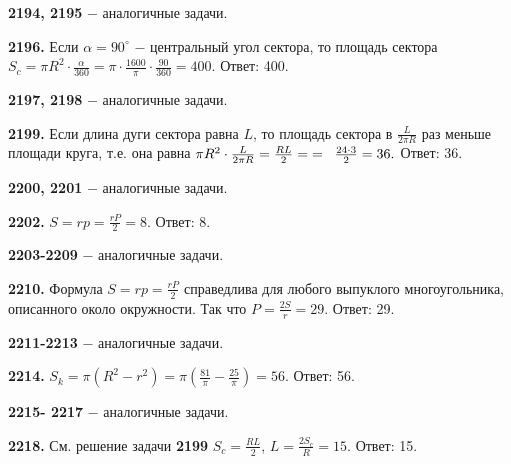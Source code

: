 \textbf{2194, 2195} $-$ аналогичные задачи.

\textbf{2196.} Если $\alpha = 90^\circ$ $-$ центральный угол сектора, то площадь сектора $S_c=\pi R^2 \cdot \frac{\alpha}{360}=\pi \cdot \frac{1600}{\pi}\cdot \frac{90}{360} =400.$ \newline \null \hspace*{\fill} Ответ: 400.

\textbf{2197, 2198} $-$ аналогичные задачи.

\textbf{2199.} Если длина дуги сектора равна $L$, то площадь сектора в $\frac{L}{2\pi R}$ раз меньше площади круга, т.е. она равна $\pi R^2 \cdot \frac{L}{2\pi R} = \frac{RL}{2}=\linebreak\;=\;\;\frac{24\cdot 3}{2}=36.$ \newline \null \hspace*{\fill} Ответ: 36.

\textbf{2200, 2201} $-$ аналогичные задачи.

\textbf{2202.} $S = rp = \frac{rP}{2}=8.$ \newline \null \hspace*{\fill} Ответ: 8.

\textbf{2203-2209} $-$ аналогичные задачи.

\textbf{2210.}  Формула $S=rp=\frac{rP}{2}$ справедлива для любого выпуклого многоугольника, описанного около окружности. Так что $P=\frac{2S}{r}=29.$ \newline \null \hspace*{\fill} Ответ: 29.

\textbf{2211-2213} $-$ аналогичные задачи.

\textbf{2214.} $S_k=\pi(R^2-r^2)=\pi\left( \frac{81}{\pi} - \frac{25}{\pi}\right)=56.$ \newline \null \hspace*{\fill} Ответ: 56.

\textbf{2215- 2217} $-$ аналогичные задачи.

\textbf{2218.} См. решение задачи \textbf{2199} $S_c = \frac{RL}{2}$, $L=\frac{2S_c}{R}=15.$ \newline \null \hspace*{\fill} Ответ: 15.